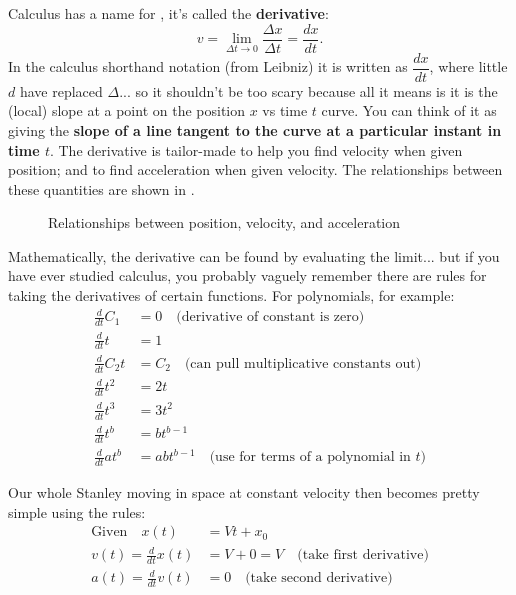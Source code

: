 \documentclass{tufte-handout}
\begin{document}
Calculus has a name for , it's called the \textbf{derivative}:
\begin{equation}
v = \lim_{\Delta t\to 0} \dfrac{\Delta x}{\Delta t} = \dfrac{dx}{dt}.
\label{eq:derivatives3}
\end{equation}
In the calculus shorthand notation (from Leibniz) it is written as $\dfrac{dx}{dt}$, where little $d$ have replaced $\Delta$... so it shouldn't be too scary because all it means is it is the (local) slope at a point on the position $x$ vs time $t$ curve. You can think of it as giving the \textbf{slope of a line tangent to the curve at a particular instant in time $t$}. The derivative is tailor-made to help you find velocity when given position; and to find acceleration when given velocity. The relationships between these quantities are shown in .
\begin{figure}
\caption{Relationships between position, velocity, and acceleration}
\label{fig:derivatives1}
\end{figure}
Mathematically, the derivative can be found by evaluating the limit... but if you have ever studied calculus, you probably vaguely remember there are rules for taking the derivatives of certain functions. For polynomials, for example:
\begin{align}
\frac{d}{dt} C_1 &= 0\quad\text{(derivative of constant is zero)}\\
\frac{d}{dt} t &= 1\\
\frac{d}{dt} C_2t &= C_2\quad\text{(can pull multiplicative constants out)}\\
\frac{d}{dt} t^2 &= 2 t \\
\frac{d}{dt} t^3 &= 3 t^2 \\
\frac{d}{dt} t^b &= b t^{b-1} \\
\frac{d}{dt} a t^b &= a b t^{b-1}\quad\text{(use for terms of a polynomial in $t$)} 
\end{align}

Our whole Stanley moving in space at constant velocity then becomes pretty simple using the rules: 
\begin{align}
\text{Given}\quad x(t) &= V t + x_0 \\
v(t) = \frac{d}{dt} x(t) &= V + 0 = V\quad\text{(take first derivative)} \\
a(t) = \frac{d}{dt} v(t) &= 0\quad\text{(take second derivative)}
\label{eq:derivatives4}
\end{align}
\end{document}
